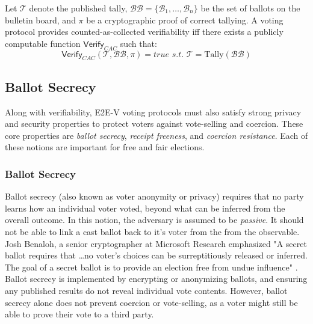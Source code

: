 \begin{definition}
Let $\mathcal{T}$ denote the published tally, $\mathcal{BB} = \{\mathcal{B}_1, \ldots, \mathcal{B}_n\}$ be the set of ballots on the bulletin board, and $\pi$ be a cryptographic proof of correct tallying. 
A voting protocol provides counted-as-collected verifiability iff there exists a publicly computable function $\mathsf{Verify}_{CAC}$ such that:
\begin{equation*}
\mathsf{Verify}_{CAC}(\mathcal{T}, \mathcal{BB}, \pi) = true \,\, s.t. \,\,\mathcal{T} = \text{Tally}(\mathcal{BB})
\end{equation*}
\end{definition}

\subsection{Ballot Secrecy}
\label{sec:ballot_secrecy}
Along with verifiability, E2E-V voting protocols must also satisfy strong privacy and security properties to protect voters against vote-selling and coercion.
These core properties are \emph{ballot secrecy}, \emph{receipt freeness}, and \emph{coercion resistance}.
Each of these notions are important for free and fair elections. 

\subsubsection{Ballot Secrecy}
Ballot secrecy (also known as voter anonymity or privacy) requires that no party learns how an individual voter voted, beyond what can be inferred from the overall outcome.
In this notion, the adversary is assumed to be \emph{passive}. 
It should not be able to link a cast ballot back to it's voter from the from the observable.
Josh Benaloh, a senior cryptographer at Microsoft Research emphasized "A secret ballot requires that \dots no voter's choices can be surreptitiously released or inferred. The goal of a secret ballot is to provide an election free from undue influence" \cite{Ben06}.
Ballot secrecy is implemented by encrypting or anonymizing ballots, and ensuring any published results do not reveal individual vote contents.
However, ballot secrecy alone does not prevent coercion or vote-selling, as a voter might still be able to prove their vote to a third party. 

